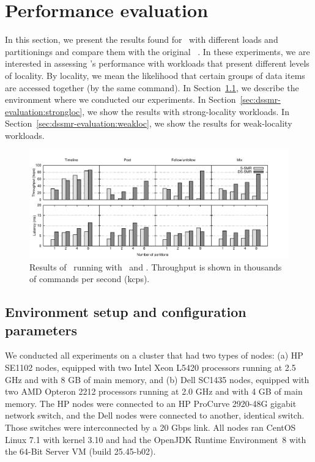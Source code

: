 \section{Performance evaluation}
\label{sec:dssmr-experiments}

In this section, we present the results found for \dssmrappname\ with different
loads and partitionings and compare them with the original
\ssmr{}~\cite{bezerra2014ssmr}. In these experiments, we are interested in
assessing \dssmr{}'s performance with workloads that present different levels of
locality. By locality, we mean the likelihood that certain groups of data items
are accessed together (by the same command). In
Section~\ref{sec:dssmr-evaluation:setup}, we describe the environment where we
conducted our experiments. In Section~\ref{sec:dssmr-evaluation:strongloc}, we
show the results with strong-locality workloads.
In Section~\ref{sec:dssmr-evaluation:weakloc}, we show the results for
weak-locality workloads.

\begin{figure}
\begin{minipage}[b]{1\linewidth}
\centering
      \includegraphics[width=1.08\linewidth]{figures/experiments/dssmr/strong-locality}
\end{minipage}
\caption{Results of \dssmrappname\ running with \ssmr\ and \dssmr{}. Throughput is shown in thousands of commands per second (kcps).}
\label{fig:dssmr-strongloc}
\end{figure}

\subsection{Environment setup and configuration parameters}
\label{sec:dssmr-evaluation:setup}

We conducted all experiments on a cluster that had two types of nodes: (a) HP
SE1102 nodes, equipped with two Intel Xeon L5420 processors running at 2.5 GHz
and with 8 GB of main memory, and (b) Dell SC1435 nodes, equipped with two AMD
Opteron 2212 processors running at 2.0 GHz and with 4 GB of main memory. The HP
nodes were connected to an HP ProCurve 2920-48G gigabit network switch, and the
Dell nodes were connected to another, identical switch. Those switches were
interconnected by a 20 Gbps link. All nodes ran CentOS Linux 7.1 with kernel
3.10 and had the OpenJDK Runtime Environment~8 with the \mbox{64-Bit} Server VM
(build 25.45-b02).

